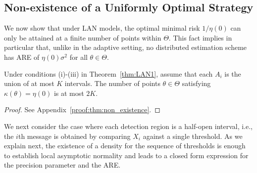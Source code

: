 \subsection{Non-existence of a Uniformly Optimal Strategy}

We now show that under LAN models, the optimal minimal risk $1/\eta(0)$ can
only be attained at a finite number of points within $\Theta$. This fact
implies in particular that, unlike in the adaptive setting, no distributed
estimation scheme has ARE of $\eta(0)\sigma^2$ for all $\theta \in \Theta$.

\begin{thm} \label{thm:non_existence}
Under conditions (i)-(iii) in Theorem~\ref{thm:LAN1}, assume that each $A_i$ is the union of at most $K$ intervals. The number of points $\theta \in \Theta$ satisfying $\kappa(\theta) = \eta(0)$ is at most $2K$. 
\end{thm}

\begin{proof}
See Appendix~\ref{proof:thm:non_existence}.
\end{proof}


We next consider the case where each detection region is a half-open interval, i.e., the $i$th message is obtained by comparing $X_i$ against a single threshold. As we explain next, the existence of a density for the sequence of thresholds is enough to establish local asymptotic normality and leads to a closed form expression for the precision parameter and the ARE.  


